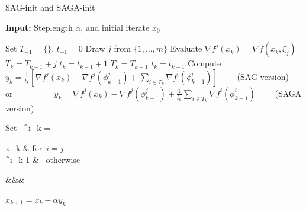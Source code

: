 \documentclass[11pt]{article}
\begin{document}
\bigskip
\begin{algorithm}
	[H] 
	\caption{SAG-init and SAGA-init}
	\label{alg:sagInit}
	{\bf Input:} Steplength $ \alpha $, and initial iterate $x_0$
	\begin{algorithmic}
		[1] 
		\State Set $T_{-1} = \{\}$, $t_{-1} = 0$ 
		\State Draw $j$ from $\{ 1, \ldots ,m\}$ 
		\State Evaluate $\nabla f^j(x_k) = \nabla f(x_k, \xi_j) $
		\State $T_{k} = T_{k-1}+j$
		\State $t_{k}=t_{k-1}+1$
		\Else
		\State $T_{k} = T_{k-1}$
		\State $t_{k}=t_{k-1}$
		\EndIf 
           \State Compute $y_k =  \frac{1}{t_k} \left[ \nabla f^j(x_k) -  \nabla f^j(\phi_{k-1}^j) + \sum_{i \in T_k}  \nabla f^i (\phi^i_{k-1}) \right]\qquad$  (SAG version)
           \State or~~~~~~~~~~$y_k = \nabla f^j(x_k) -  \nabla f^j(\phi_{k-1}^j) +  \frac{1}{t_k} \sum_{i \in T_k}  \nabla f^i (\phi^i_{k-1})\qquad$ (SAGA version)
		\State \begin{flalign}   \mbox{Set   }  \phi^i_k =
		\begin{cases} 
  x_k & \mbox{for $i =j$ } \\
  \phi^i_{k-1} & \mbox{ otherwise} 
 \end{cases}&&&
\end{flalign}
		\State $x_{k+1} = x_k - \alpha y_k$ 
		\EndLoop 
	\end{algorithmic}
\end{algorithm}


\end{document}
